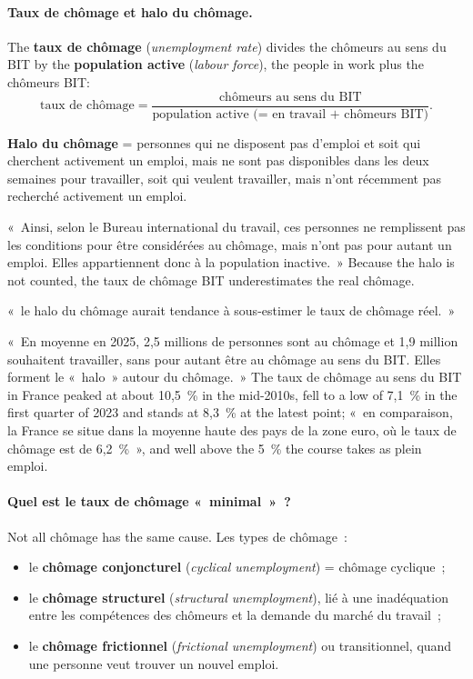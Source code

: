 \paragraph{Taux de chômage et halo du chômage.} The \textbf{taux de chômage}
(\textit{unemployment rate}) divides the chômeurs au sens du BIT by the
\textbf{population active} (\textit{labour force}), the people in work plus the
chômeurs BIT:
\[
  \text{taux de chômage}
  = \frac{\text{chômeurs au sens du BIT}}
         {\text{population active (= en travail + chômeurs BIT)}} .
\]

\begin{definition}
  \textbf{Halo du chômage} = personnes qui ne disposent pas d'emploi et soit qui
  cherchent activement un emploi, mais ne sont pas disponibles dans les deux
  semaines pour travailler, soit qui veulent travailler, mais n'ont récemment pas
  recherché activement un emploi.
\end{definition}

«~Ainsi, selon le Bureau international du travail, ces personnes ne remplissent
pas les conditions pour être considérées au chômage, mais n'ont pas pour autant
un emploi. Elles appartiennent donc à la population inactive.~» Because the halo
is not counted, the taux de chômage BIT underestimates the real chômage.

\begin{remark}
  «~le halo du chômage aurait tendance à sous-estimer le taux de chômage réel.~»
\end{remark}

«~En moyenne en 2025, 2,5 millions de personnes sont au chômage et 1,9 million
souhaitent travailler, sans pour autant être au chômage au sens du BIT. Elles
forment le «~halo~» autour du chômage.~» The taux de chômage au sens du BIT in
France peaked at about 10,5~\% in the mid-2010s, fell to a low of 7,1~\% in the
first quarter of 2023 and stands at 8,3~\% at the latest point; «~en
comparaison, la France se situe dans la moyenne haute des pays de la zone euro,
où le taux de chômage est de 6,2~\%~», and well above the 5~\% the course takes
as plein emploi.

\paragraph{Quel est le taux de chômage «~minimal~»~?} Not all chômage has the
same cause. Les types de chômage~:
\begin{itemize}
  \item le \textbf{chômage conjoncturel} (\textit{cyclical unemployment}) =
    chômage cyclique~;
  \item le \textbf{chômage structurel} (\textit{structural unemployment}), lié à
    une inadéquation entre les compétences des chômeurs et la demande du marché du
    travail~;
  \item le \textbf{chômage frictionnel} (\textit{frictional unemployment}) ou
    transitionnel, quand une personne veut trouver un nouvel emploi.
\end{itemize}

